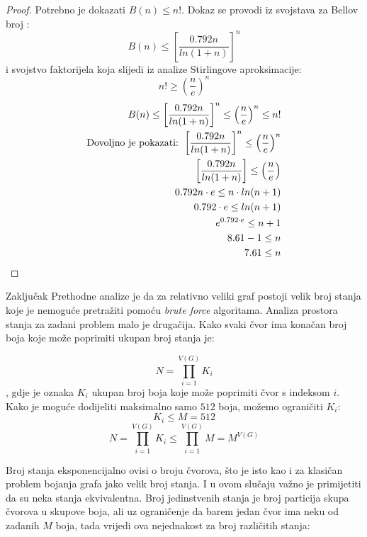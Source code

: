 \documentclass[times, utf8, diplomski, numeric]{fer}
\begin{document}
\begin{proof}
	Potrebno je dokazati $B(n) \le n!$. Dokaz se provodi iz svojstava za Bellov broj \cite{lit20}:
	\[ B(n) \le \left [ \frac{0.792 n}{ln(1+n)} \right ]^n \] 
	i svojstvo faktorijela koja slijedi iz analize Stirlingove aproksimacije: \[ n!\ge \left ( \frac{n}{e} \right )^n \]
	\begin{align}
		B(n) \le \left [ \frac{0.792 n}{ln(1+n)} \right ]^n \le \left ( \frac{n}{e} \right )^n \le n! \\
		\textup{Dovoljno je pokazati: } \left [ \frac{0.792 n}{ln(1+n)} \right ]^n \le \left ( \frac{n}{e} \right )^n \\
		\left [ \frac{0.792 n}{ln(1+n)} \right ] \le \left ( \frac{n}{e} \right ) \\
		0.792 n\cdot e \le n \cdot ln(n+1) \\
		0.792\cdot e \le ln(n+1) \\
		e^{0.792\cdot e} \le n+1 \\
		8.61 -1 \le n \\
		7.61 \le n
	\end{align}
\end{proof}

Zaključak Prethodne analize je da za relativno veliki graf postoji velik broj stanja koje je nemoguće pretražiti pomoću \emph{brute force} algoritama. Analiza prostora stanja za zadani problem malo je drugačija. Kako svaki čvor ima konačan broj boja koje može poprimiti ukupan broj stanja je:

\begin{equation}
N = \prod_{i=1}^{V(G)} K_i
\end{equation}
, gdje je oznaka $K_i$ ukupan broj boja koje može poprimiti čvor s indeksom $i$. Kako je moguće dodijeliti maksimalno samo $512$ boja, možemo ograničiti $K_i$:
\begin{equation}
K_i \le M = 512
\end{equation}
\begin{equation}
N = \prod_{i=1}^{V(G)} K_i \le \prod_{i=1}^{V(G)} M = M^{V(G)}
\end{equation}

Broj stanja eksponencijalno ovisi o broju čvorova, što je isto kao i za klasičan problem bojanja grafa jako velik broj stanja. I u ovom slučaju važno je primijetiti da su neka stanja ekvivalentna. Broj jedinstvenih stanja je broj particija skupa čvorova u skupove boja, ali uz ograničenje da barem jedan čvor ima neku od zadanih $M$ boja, tada vrijedi ova nejednakost za broj različitih stanja:
\end{document}
